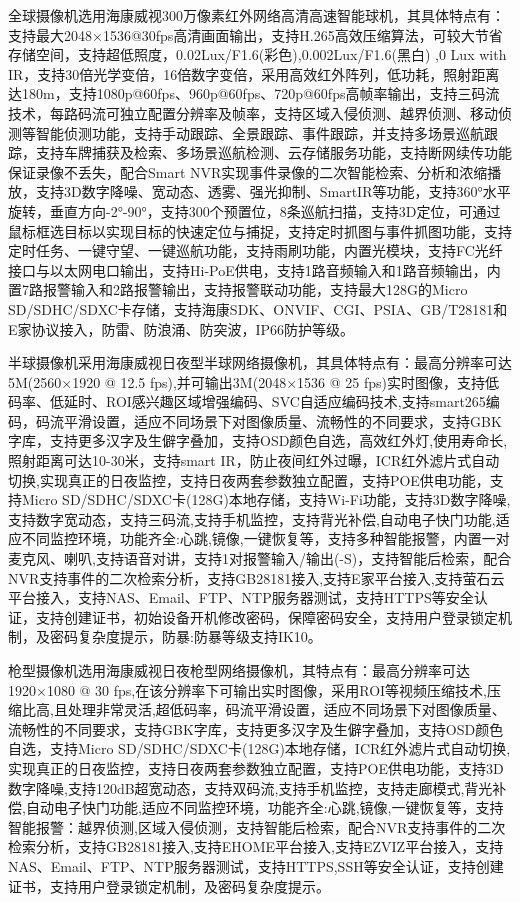 \documentclass{gdutart}
\begin{document}
      全球摄像机选用海康威视300万像素红外网络高清高速智能球机，其具体特点有：支持最大2048×1536@30fps高清画面输出，支持H.265高效压缩算法，可较大节省存储空间，支持超低照度，0.02Lux/F1.6(彩色),0.002Lux/F1.6(黑白) ,0 Lux with IR，支持30倍光学变倍，16倍数字变倍，采用高效红外阵列，低功耗，照射距离达180m，支持1080p@60fps、960p@60fps、720p@60fps高帧率输出，支持三码流技术，每路码流可独立配置分辨率及帧率，支持区域入侵侦测、越界侦测、移动侦测等智能侦测功能，支持手动跟踪、全景跟踪、事件跟踪，并支持多场景巡航跟踪，支持车牌捕获及检索、多场景巡航检测、云存储服务功能，支持断网续传功能保证录像不丢失，配合Smart NVR实现事件录像的二次智能检索、分析和浓缩播放，支持3D数字降噪、宽动态、透雾、强光抑制、SmartIR等功能，支持360°水平旋转，垂直方向-2°-90°，支持300个预置位，8条巡航扫描，支持3D定位，可通过鼠标框选目标以实现目标的快速定位与捕捉，支持定时抓图与事件抓图功能，支持定时任务、一键守望、一键巡航功能，支持雨刷功能，内置光模块，支持FC光纤接口与以太网电口输出，支持Hi-PoE供电，支持1路音频输入和1路音频输出，内置7路报警输入和2路报警输出，支持报警联动功能，支持最大128G的Micro SD/SDHC/SDXC卡存储，支持海康SDK、ONVIF、CGI、PSIA、GB/T28181和E家协议接入，防雷、防浪涌、防突波，IP66防护等级。

      半球摄像机采用海康威视日夜型半球网络摄像机，其具体特点有：最高分辨率可达5M(2560×1920 @ 12.5 fps),并可输出3M(2048×1536 @ 25 fps)实时图像，支持低码率、低延时、ROI感兴趣区域增强编码、SVC自适应编码技术,支持smart265编码，码流平滑设置，适应不同场景下对图像质量、流畅性的不同要求，支持GBK字库，支持更多汉字及生僻字叠加，支持OSD颜色自选，高效红外灯,使用寿命长,照射距离可达10-30米，支持smart IR，防止夜间红外过曝，ICR红外滤片式自动切换,实现真正的日夜监控，支持日夜两套参数独立配置，支持POE供电功能，支持Micro SD/SDHC/SDXC卡(128G)本地存储，支持Wi-Fi功能，支持3D数字降噪, 支持数字宽动态，支持三码流,支持手机监控，支持背光补偿,自动电子快门功能,适应不同监控环境，功能齐全:心跳,镜像,一键恢复等，支持多种智能报警，内置一对麦克风、喇叭,支持语音对讲，支持1对报警输入/输出(-S)，支持智能后检索，配合NVR支持事件的二次检索分析，支持GB28181接入,支持E家平台接入,支持萤石云平台接入，支持NAS、Email、FTP、NTP服务器测试，支持HTTPS等安全认证，支持创建证书，初始设备开机修改密码，保障密码安全，支持用户登录锁定机制，及密码复杂度提示，防暴:防暴等级支持IK10。

      枪型摄像机选用海康威视日夜枪型网络摄像机，其特点有：最高分辨率可达1920×1080 @ 30 fps,在该分辨率下可输出实时图像，采用ROI等视频压缩技术,压缩比高,且处理非常灵活,超低码率，码流平滑设置，适应不同场景下对图像质量、流畅性的不同要求，支持GBK字库，支持更多汉字及生僻字叠加，支持OSD颜色自选，支持Micro SD/SDHC/SDXC卡(128G)本地存储，ICR红外滤片式自动切换,实现真正的日夜监控，支持日夜两套参数独立配置，支持POE供电功能，支持3D数字降噪,支持120dB超宽动态，支持双码流,支持手机监控，支持走廊模式,背光补偿,自动电子快门功能,适应不同监控环境，功能齐全:心跳,镜像,一键恢复等，支持智能报警：越界侦测,区域入侵侦测，支持智能后检索，配合NVR支持事件的二次检索分析，支持GB28181接入,支持EHOME平台接入,支持EZVIZ平台接入，支持NAS、Email、FTP、NTP服务器测试，支持HTTPS,SSH等安全认证，支持创建证书，支持用户登录锁定机制，及密码复杂度提示。
\end{document}
